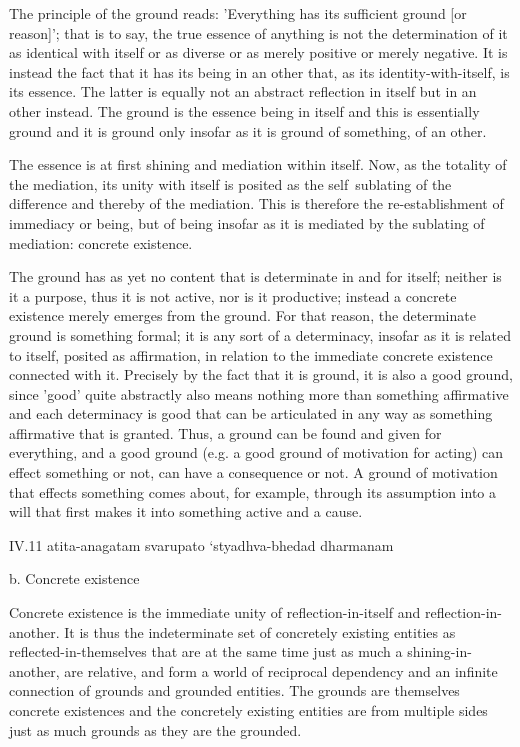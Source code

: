     The principle of the ground reads:
    'Everything has its sufficient ground [or reason]';
    that is to say, the true essence of anything is not
    the determination of it as identical with itself or
    as diverse or as merely positive or merely negative.
    It is instead the fact that it has its being in an other that,
    as its identity-with-itself, is its essence.
    The latter is equally not an abstract reflection
    in itself but in an other instead.
    The ground is the essence being in itself and
    this is essentially ground and it is ground only
    insofar as it is ground of something, of an other.

The essence is at first shining and mediation within itself.
Now, as the totality of the mediation, its unity with itself is posited
as the self~sublating of the difference and thereby of the mediation.
This is therefore the re-establishment of immediacy or being,
but of being insofar as it is mediated by the sublating of mediation:
concrete existence.

    The ground has as yet no content that is determinate in and for itself;
    neither is it a purpose, thus it is not active, nor is it productive;
    instead a concrete existence merely emerges from the ground.
    For that reason, the determinate ground is something formal;
    it is any sort of a determinacy,
    insofar as it is related to itself, posited as affirmation,
    in relation to the immediate concrete existence connected with it.
    Precisely by the fact that it is ground, it is also a good ground,
    since 'good' quite abstractly also means nothing more than something
    affirmative and each determinacy is good that can be articulated in
    any way as something affirmative that is granted.
    Thus, a ground can be found and given for everything,
    and a good ground (e.g. a good ground of motivation for acting)
    can effect something or not, can have a consequence or not.
    A ground of motivation that effects something comes about,
    for example, through its assumption into a will that
    first makes it into something active and a cause.

IV.11
atita-anagatam svarupato ‘styadhva-bhedad dharmanam

b. Concrete existence

Concrete existence is the immediate unity of
reflection-in-itself and reflection-in-another.
It is thus the indeterminate set of concretely
existing entities as reflected-in-themselves
that are at the same time just as much
a shining-in-another, are relative, and
form a world of reciprocal dependency and
an infinite connection of grounds and grounded entities.
The grounds are themselves concrete existences and
the concretely existing entities are from multiple sides
just as much grounds as they are the grounded.


